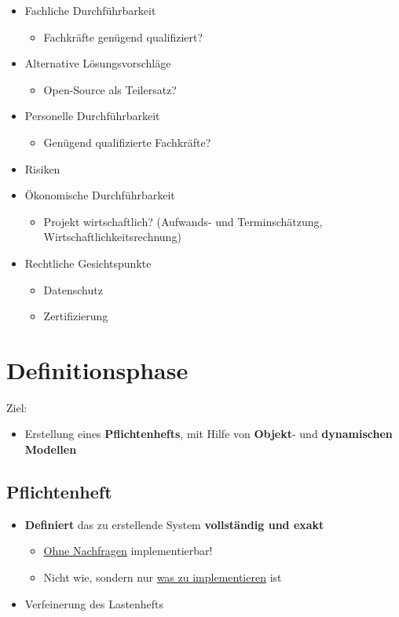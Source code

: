 \documentclass[parskip=full, 12pt]{scrartcl}
\begin{document}
			\begin{itemize}
				\item Fachliche Durchführbarkeit
				\begin{itemize}
					\item Fachkräfte genügend qualifiziert?
				\end{itemize}
				\item Alternative Lösungsvorschläge
				\begin{itemize}
					\item Open-Source als Teilersatz?
				\end{itemize}
				\item Personelle Durchführbarkeit
				\begin{itemize}
					\item Genügend qualifizierte Fachkräfte?
				\end{itemize}
				\item Risiken
				\item Ökonomische Durchführbarkeit
				\begin{itemize}
					\item Projekt wirtschaftlich? (Aufwands- und Terminschätzung, Wirtschaftlichkeitsrechnung)
				\end{itemize}
				\item Rechtliche Gesichtspunkte
				\begin{itemize}
					\item Datenschutz
					\item Zertifizierung
				\end{itemize}
			\end{itemize}
	
	\newpage
	\section{Definitionsphase}
	
		Ziel:
		
		\begin{itemize}
			\item Erstellung eines \textbf{Pflichtenhefts}, mit Hilfe von \textbf{Objekt}- und \textbf{dynamischen Modellen}
		\end{itemize}
	
		\subsection{Pflichtenheft}
		
			\begin{itemize}
				\item  \textbf{Definiert} das zu erstellende System \textbf{vollständig und exakt}
				\begin{itemize}
					\item \underline{Ohne Nachfragen} implementierbar!
					\item Nicht wie, sondern nur \underline{was zu implementieren} ist
				\end{itemize}
				\item Verfeinerung des Lastenhefts
			\end{itemize}
		
\end{document}
